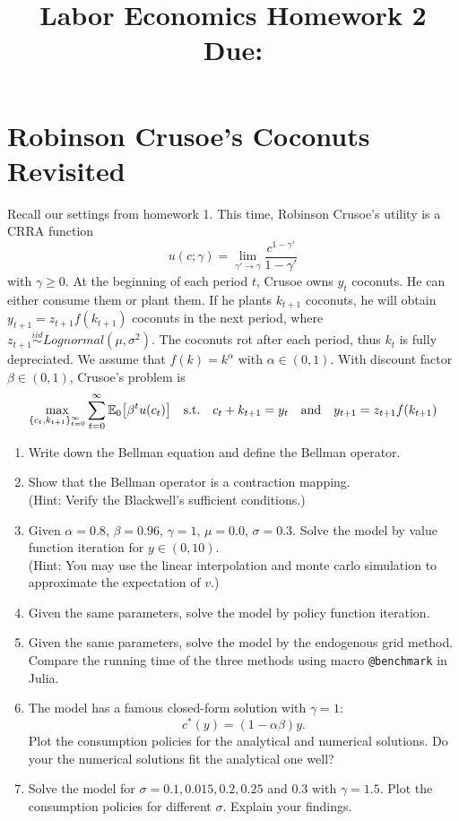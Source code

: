 \documentclass[12pt]{article}
\title{
    Labor Economics Homework 2 \\
    \large Due: \\
    }
\author{}
\date{}
\begin{document}

\maketitle

\section{Robinson Crusoe's Coconuts Revisited}
Recall our settings from homework 1. This time, 
Robinson Crusoe's utility is a CRRA function 
\begin{equation*}
    u(c; \gamma) = \lim_{\gamma'\to\gamma}\frac{c^{1-\gamma'}}{1-\gamma'}
\end{equation*}
with $\gamma\geq 0$. At the beginning of each period 
$t$, Crusoe owns $y_t$ coconuts. He 
can either consume them or plant them. If he plants 
$k_{t+1}$ coconuts, he will obtain $y_{t+1} = 
z_{t+1}f(k_{t+1})$ coconuts in the next period, where 
$z_{t+1}\overset{iid}{\sim} Lognormal(\mu,\sigma^2)$. 
The coconuts rot after each period, thus $k_t$ 
is fully depreciated. We assume that $f(k) = 
k^\alpha$ with $\alpha \in (0,1)$. With discount 
factor $\beta\in(0,1)$, Crusoe's problem is 
\begin{equation*}
    \max_{\{c_t,k_{t+1}\}_{t=0}^\infty} \sum_{t=0}^\infty 
    \E_0\sbrc{\beta^t u(c_t)} \quad \text{s.t.} \quad 
    c_t + k_{t+1} = y_t \quad \text{and} \quad y_{t+1} = 
    z_{t+1}f(k_{t+1})
\end{equation*} 
\begin{enumerate}
    \item Write down the Bellman equation and define the Bellman operator. 
    \item Show that the Bellman operator is a contraction mapping.\\
    (Hint: Verify the Blackwell's sufficient conditions.)
    \item Given $\alpha = 0.8$, $\beta = 0.96$, $\gamma = 1$, $\mu = 0.0$, $\sigma = 0.3$. 
    Solve the model by value function iteration for $y\in(0,10)$.\\
    (Hint: You may use the linear interpolation and monte carlo simulation to 
    approximate the expectation of $v$.)
    \item Given the same parameters, solve the model by policy function 
    iteration. 
    \item Given the same parameters, solve the model by the endogenous grid 
    method. Compare the running time of the three methods using macro 
    \texttt{@benchmark} in Julia. 
    \item The model has a famous closed-form solution with $\gamma = 1$:
    \begin{equation*}
        c^*(y) = (1-\alpha\beta)y.
    \end{equation*}
    Plot the consumption policies for the analytical and numerical solutions. 
    Do your the numerical solutions fit the analytical one well?
    \item Solve the model for $\sigma = 0.1, 0.015, 0.2, 0.25$ and $0.3$ with 
    $\gamma = 1.5$. Plot the consumption policies for different $\sigma$. 
    Explain your findings. 
\end{enumerate}
\end{document}
